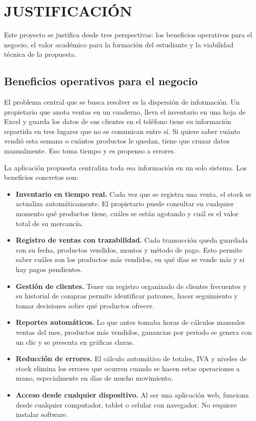 \documentclass[spanish]{ieee_upb}
\begin{document}
\newpage
\section{JUSTIFICACIÓN}

Este proyecto se justifica desde tres perspectivas: los beneficios operativos para el negocio, el valor académico para la formación del estudiante y la viabilidad técnica de la propuesta.

\subsection{Beneficios operativos para el negocio}

El problema central que se busca resolver es la dispersión de información. Un propietario que anota ventas en un cuaderno, lleva el inventario en una hoja de Excel y guarda los datos de sus clientes en el teléfono tiene su información repartida en tres lugares que no se comunican entre sí. Si quiere saber cuánto vendió esta semana o cuántos productos le quedan, tiene que cruzar datos manualmente. Eso toma tiempo y es propenso a errores.

La aplicación propuesta centraliza toda esa información en un solo sistema. Los beneficios concretos son:

\begin{itemize}
	\item \textbf{Inventario en tiempo real.} Cada vez que se registra una venta, el stock se actualiza automáticamente. El propietario puede consultar en cualquier momento qué productos tiene, cuáles se están agotando y cuál es el valor total de su mercancía.
	\item \textbf{Registro de ventas con trazabilidad.} Cada transacción queda guardada con su fecha, productos vendidos, montos y método de pago. Esto permite saber cuáles son los productos más vendidos, en qué días se vende más y si hay pagos pendientes.
	\item \textbf{Gestión de clientes.} Tener un registro organizado de clientes frecuentes y su historial de compras permite identificar patrones, hacer seguimiento y tomar decisiones sobre qué productos ofrecer.
	\item \textbf{Reportes automáticos.} Lo que antes tomaba horas de cálculos manuales ventas del mes, productos más vendidos, ganancias por período  se genera con un clic y se presenta en gráficas claras.
	\item \textbf{Reducción de errores.} El cálculo automático de totales, IVA y niveles de stock elimina los errores que ocurren cuando se hacen estas operaciones a mano, especialmente en días de mucho movimiento.
	\item \textbf{Acceso desde cualquier dispositivo.} Al ser una aplicación web, funciona desde cualquier computador, tablet o celular con navegador. No requiere instalar software.
\end{itemize}
\end{document}

